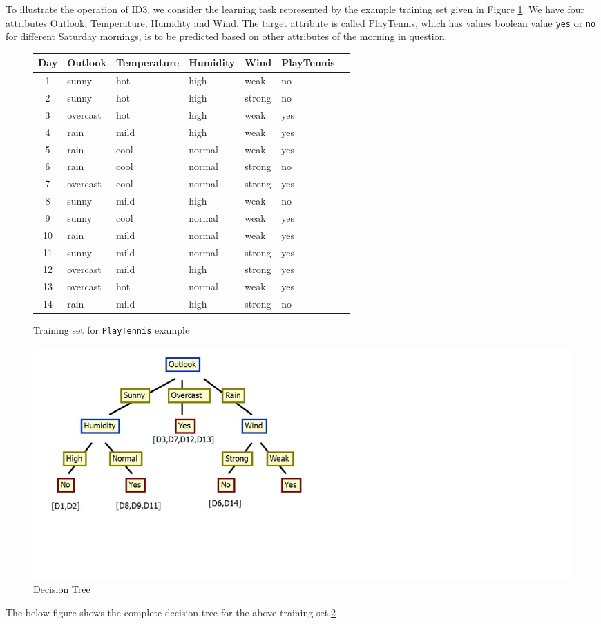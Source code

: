 \documentclass{report}
\begin{document}
To illustrate the operation of ID3, we consider the learning task represented by the example training set given in Figure \ref{fig:trainingplaytennis}. We have four attributes Outlook, Temperature, Humidity and Wind. The target attribute is called PlayTennis, which has values boolean value \texttt{yes} or \texttt{no} for different Saturday mornings, is to be predicted based on other attributes of the morning in question.
\begin{figure}[h]
  \centering
  \begin{tabular}{|c|l|l|l|l|l|l|}
    \hline
    Day & Outlook & Temperature & Humidity & Wind & PlayTennis\\
    \hline
    1 & sunny & hot & high & weak & no
    \\\hline
    2 & sunny & hot & high & strong & no
    \\\hline
    3 & overcast & hot & high & weak & yes
    \\\hline
    4 & rain & mild & high & weak & yes
    \\\hline
    5 & rain & cool & normal & weak & yes
    \\\hline
    6 & rain & cool & normal & strong & no
    \\\hline
    7 & overcast & cool & normal & strong & yes
    \\\hline
    8 & sunny & mild & high & weak & no
    \\\hline
    9 & sunny & cool & normal & weak & yes
    \\\hline
    10 & rain & mild & normal & weak & yes
    \\\hline
    11 & sunny & mild & normal & strong & yes
    \\\hline
    12 & overcast & mild & high & strong & yes
    \\\hline
    13 & overcast & hot & normal & weak & yes
    \\\hline
    14 & rain & mild & high & strong & no
    \\\hline
  \end{tabular}
  \caption{Training set for \texttt{PlayTennis} example}
  \label{fig:trainingplaytennis}
\end{figure}

\begin{figure}[h]
\centering
\includegraphics[bb=0 0 1360 588,scale=0.5,keepaspectratio=true]{DecisionTree.jpg}
\caption{Decision Tree}
\label{fig:decisiontree}
\end{figure}
The below figure shows the complete decision tree for the above training set.\ref{fig:decisiontree}\\
\end{document}
